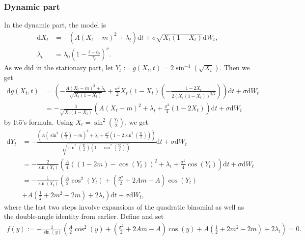 \subsubsection{Dynamic part}
In the dynamic part, the model is
\begin{align}
    \mathrm{d}X_t &= -\left(A(X_t - m)^2 + \lambda_t\right)\mathrm{d}t + \sigma \sqrt{X_t\left(1 - X_t\right)}\mathrm{d}W_t,\\
    \lambda_t &= \lambda_0 \left(1 - \frac{t - t_0}{\tau_c}\right)^\nu.
\end{align}
As we did in the stationary part, let $Y_t := g(X_t, t) = 2 \sin^{-1}\left(\sqrt{X_t}\right)$. Then we get 
\begin{align}
    \mathrm{d}g(X_t, t) &= \left(-\frac{A(X_t - m)^2 + \lambda_t}{\sqrt{X_t\left(1 - X_t\right)}} + \frac{\sigma^2}{2}X_t\left(1 - X_t\right)\left(-\frac{1 - 2X_t}{2\left(X_t\left(1 - X_t\right)\right)^{3/2}}\right)\right)\mathrm{d}t + \sigma\mathrm{d}W_t \nonumber\\
    &= -\frac{1}{\sqrt{X_t\left(1 - X_t\right)}}\left(A\left(X_t - m\right)^2 + \lambda_t + \frac{\sigma^2}{4}\left(1 - 2X_t\right)\right)\mathrm{d}t + \sigma\mathrm{d}W_t
\end{align}
by Itō's formula. Using $X_t = \sin^2\left(\frac{Y_t}{2}\right)$, we get
\begin{align}
    \mathrm{d}Y_t &= -\frac{\left(A\left(\sin^2\left(\frac{Y_t}{2}\right) - m\right)^2 + \lambda_t + \frac{\sigma^2}{4}\left(1 - 2\sin^2\left(\frac{Y_t}{2}\right)\right)\right)}{\sqrt{\sin^2\left(\frac{Y_t}{2}\right)\left(1 - \sin^2\left(\frac{Y_t}{2}\right)\right)}}\mathrm{d}t + \sigma\mathrm{d}W_t \nonumber \\
    &= -\frac{2}{\sin(Y_t)}\left(\frac{A}{4}\left(\left(1 - 2m\right) - \cos(Y_t)\right)^2 + \lambda_t + \frac{\sigma^2}{4}\cos(Y_t)\right)\mathrm{d}t + \sigma\mathrm{d}W_t\nonumber \\
    &= - \frac{1}{\sin(Y_t)}\left(\frac{A}{2}\cos^2(Y_t) + \left(\frac{\sigma^2}{2} + 2 Am - A\right)\cos(Y_t) \right. \nonumber \\
    &+ \left. A \left(\frac{1}{2} + 2m^2 - 2m\right) + 2\lambda_t\right)\mathrm{d}t + \sigma \mathrm{d}W_t, \label{eq:JacobiLampertiDynamicSDE}
\end{align}
where the last two steps involve expansions of the quadratic binomial as well as the double-angle identity from earlier. Define and set
\begin{align*}
    f(y):= -\frac{1}{\sin(y)}\left(\frac{A}{2}\cos^2(y) + \left(\frac{\sigma^2}{2} + 2 Am - A\right)\cos(y)
    + A \left(\frac{1}{2} + 2m^2 - 2m\right) + 2\lambda_t\right) = 0.
\end{align*}
